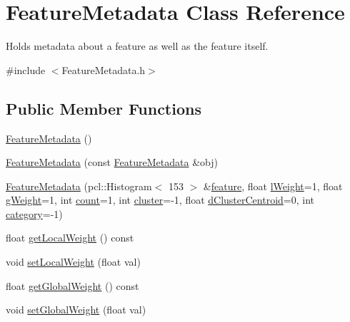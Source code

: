 \hypertarget{class_feature_metadata}{}\section{Feature\+Metadata Class Reference}
\label{class_feature_metadata}


Holds metadata about a feature as well as the feature itself.  




{\ttfamily \#include $<$Feature\+Metadata.\+h$>$}

\subsection*{Public Member Functions}
\begin{DoxyCompactItemize}
\item 
\hyperlink{class_feature_metadata_ab117cd690bb70fe8795422f976a251d7}{Feature\+Metadata} ()
\item 
\hyperlink{class_feature_metadata_ac94095ccb8ba325b552dd192c86bce09}{Feature\+Metadata} (const \hyperlink{class_feature_metadata}{Feature\+Metadata} \&obj)
\item 
\hyperlink{class_feature_metadata_a1374c7d4f2e24bf0cf343949eeb93422}{Feature\+Metadata} (pcl\+::\+Histogram$<$ 153 $>$ \&\hyperlink{class_feature_metadata_a0b288799d230ccf13d34efd60165ebb6}{feature}, float \hyperlink{class_feature_metadata_a5b7a2efcdc98b2fc62fd7e47eceed296}{l\+Weight}=1, float \hyperlink{class_feature_metadata_acb096e77efd9a31c51b99682160324ce}{g\+Weight}=1, int \hyperlink{class_feature_metadata_a722c6a86c099fc76fe4d25aedaf98c1c}{count}=1, int \hyperlink{class_feature_metadata_a7f5a6347721de970e0dd5abf4b0a8455}{cluster}=-\/1, float \hyperlink{class_feature_metadata_ab8a28f696d38b7bdd3aeef92a3453bcf}{d\+Cluster\+Centroid}=0, int \hyperlink{class_feature_metadata_a30e96aabc8090f41b8136cbb274da383}{category}=-\/1)
\item 
float \hyperlink{class_feature_metadata_a03bdbfab84fa2b98930093657d40735c}{get\+Local\+Weight} () const
\item 
void \hyperlink{class_feature_metadata_a48c33c739f9ee12a04c3cf01a09d4f47}{set\+Local\+Weight} (float val)
\item 
float \hyperlink{class_feature_metadata_a0ba779c2a9d106b987edc306b14f3191}{get\+Global\+Weight} () const
\item 
void \hyperlink{class_feature_metadata_a135f89c383379bee9943acec65d3bdeb}{set\+Global\+Weight} (float val)

\end{DoxyCompactItemize}
